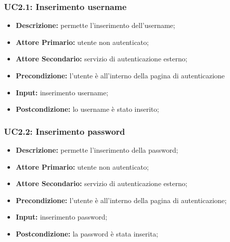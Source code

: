 \subsubsection{UC2.1: Inserimento username}
\label{sec:UC2.1}
\begin{itemize}
    \item \textbf{Descrizione:} permette l'inserimento dell'username;
    \item \textbf{Attore Primario:} utente non autenticato;
    \item \textbf{Attore Secondario:} servizio di autenticazione esterno;
    \item \textbf{Precondizione:} l'utente è all'interno della pagina di autenticazione
    \item \textbf{Input:} inserimento username;
    \item \textbf{Postcondizione:} lo username è stato inserito;
\end{itemize}
\subsubsection{UC2.2: Inserimento password}
\label{sec:UC2.2}
\begin{itemize}
    \item \textbf{Descrizione:} permette l'inserimento della password;
    \item \textbf{Attore Primario:} utente non autenticato;
    \item \textbf{Attore Secondario:} servizio di autenticazione esterno;
    \item \textbf{Precondizione:} l'utente è all'interno della pagina di autenticazione;
    \item \textbf{Input:} inserimento password;
    \item \textbf{Postcondizione:} la password è stata inserita;
\end{itemize}

